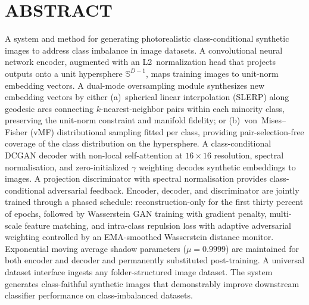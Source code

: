 \documentclass[12pt,letterpaper]{article}
\newcommand{\Sphere}{\mathbb{S}}
\begin{document}
\section*{ABSTRACT}

A system and method for generating photorealistic class-conditional synthetic
images to address class imbalance in image datasets.  A convolutional neural
network encoder, augmented with an L2~normalization head that projects
outputs onto a unit hypersphere $\Sphere^{D-1}$, maps training images to
unit-norm embedding vectors.  A dual-mode oversampling module synthesizes new
embedding vectors by either (a)~spherical linear interpolation (SLERP) along
geodesic arcs connecting $k$-nearest-neighbor pairs within each minority
class, preserving the unit-norm constraint and manifold fidelity; or
(b)~von~Mises--Fisher (vMF) distributional sampling fitted per class,
providing pair-selection-free coverage of the class distribution on the
hypersphere.  A class-conditional DCGAN decoder with non-local self-attention
at $16\times16$ resolution, spectral normalisation, and zero-initialized
$\gamma$ weighting decodes synthetic embeddings to images.  A projection
discriminator with spectral normalisation provides class-conditional
adversarial feedback.  Encoder, decoder, and discriminator are jointly trained
through a phased schedule: reconstruction-only for the first thirty percent of
epochs, followed by Wasserstein GAN training with gradient penalty,
multi-scale feature matching, and intra-class repulsion loss with adaptive
adversarial weighting controlled by an EMA-smoothed Wasserstein distance
monitor.  Exponential moving average shadow parameters ($\mu = 0.9999$) are
maintained for both encoder and decoder and permanently substituted
post-training.  A universal dataset interface ingests any folder-structured
image dataset.  The system generates class-faithful synthetic images that
demonstrably improve downstream classifier performance on class-imbalanced
datasets.
\end{document}
